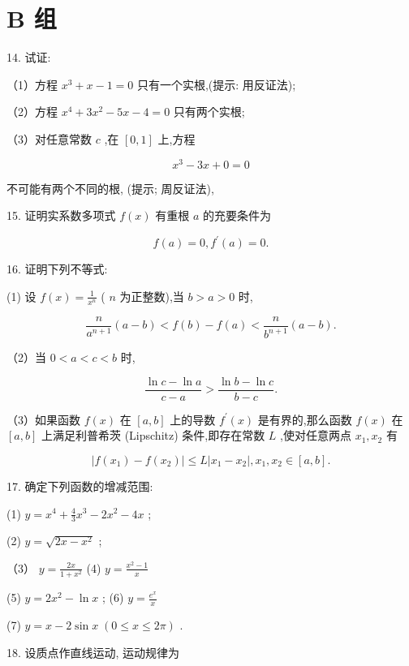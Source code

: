 \documentclass[lang=cn,newtx,10pt,scheme=chinese]{elegantbook}
\begin{document}
\section*{B 组}

14. 试证:

（1）方程 \({x}^{3} + x - 1 = 0\) 只有一个实根,(提示: 用反证法);

（2）方程 \({x}^{4} + 3{x}^{2} - {5x} - 4 = 0\) 只有两个实根;

（3）对任意常数 \(c\) ,在 \(\left\lbrack {0,1}\right\rbrack\) 上,方程

\[
{x}^{3} - {3x} + 0 = 0
\]

不可能有两个不同的根, (提示; 周反证法),

15. 证明实系数多项式 \(f\left( x\right)\) 有重根 \(a\) 的充要条件为

\[
f\left( a\right) = 0,{f}^{\prime }\left( a\right) = 0.
\]

16. 证明下列不等式:

(1) 设 \(f\left( x\right) = \frac{1}{{x}^{n}}\) ( \(n\) 为正整数),当 \(b > a > 0\) 时,

\[
\frac{n}{{a}^{n + 1}}\left( {a - b}\right) < f\left( b\right) - f\left( a\right) < \frac{n}{{b}^{n + 1}}\left( {a - b}\right) .
\]

（2）当 \(0 < a < c < b\) 时,

\[
\frac{\ln c - \ln a}{c - a} > \frac{\ln b - \ln c}{b - c}.
\]

（3）如果函数 \(f\left( x\right)\) 在 \(\left\lbrack {a,b}\right\rbrack\) 上的导数 \({f}^{\prime }\left( x\right)\) 是有界的,那么函数 \(f\left( x\right)\) 在 \(\left\lbrack {a,b}\right\rbrack\) 上满足利普希茨 (Lipschitz) 条件,即存在常数 \(L\) ,使对任意两点 \({x}_{1},{x}_{2}\) 有

\[
\left| {f\left( {x}_{1}\right) - f\left( {x}_{2}\right) }\right| \leq L\left| {{x}_{1} - {x}_{2}}\right| ,{x}_{1},{x}_{2} \in \left\lbrack {a,b}\right\rbrack .
\]

17. 确定下列函数的增减范围:

(1) \(y = {x}^{4} + \frac{4}{3}{x}^{3} - 2{x}^{2} - {4x}\) ;

(2) \(y = \sqrt{{2x} - {x}^{2}}\) ;

（3） \(y = \frac{2x}{1 + {x}^{2}}\) (4) \(y = \frac{{x}^{2} - 1}{x}\)

(5) \(y = 2{x}^{2} - \ln x\) ; (6) \(y = \frac{{e}^{x}}{x}\)

(7) \(y = x - 2\sin x\;\left( {0 \leq x \leq {2\pi }}\right)\) .

18. 设质点作直线运动, 运动规律为
\end{document}
